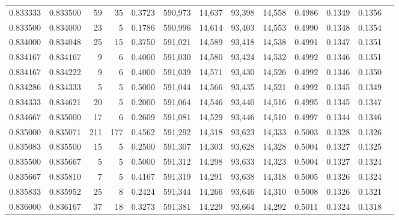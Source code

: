\begin{tabular}{rrrrrrrrrrrrr}
0.833333 & 0.833500 &    59 &  35 &                                     0.3723 & 590,973 &  14,637 &  93,398 &  14,558 & 0.4986 & 0.1349 & 0.1356 \\
0.833500 & 0.834000 &    23 &   5 &                                     0.1786 & 590,996 &  14,614 &  93,403 &  14,553 & 0.4990 & 0.1348 & 0.1354 \\
0.834000 & 0.834048 &    25 &  15 &                                     0.3750 & 591,021 &  14,589 &  93,418 &  14,538 & 0.4991 & 0.1347 & 0.1351 \\
0.834167 & 0.834167 &     9 &   6 &                                     0.4000 & 591,030 &  14,580 &  93,424 &  14,532 & 0.4992 & 0.1346 & 0.1351 \\
0.834167 & 0.834222 &     9 &   6 &                                     0.4000 & 591,039 &  14,571 &  93,430 &  14,526 & 0.4992 & 0.1346 & 0.1350 \\
0.834286 & 0.834333 &     5 &   5 &                                     0.5000 & 591,044 &  14,566 &  93,435 &  14,521 & 0.4992 & 0.1345 & 0.1349 \\
0.834333 & 0.834621 &    20 &   5 &                                     0.2000 & 591,064 &  14,546 &  93,440 &  14,516 & 0.4995 & 0.1345 & 0.1347 \\
0.834667 & 0.835000 &    17 &   6 &                                     0.2609 & 591,081 &  14,529 &  93,446 &  14,510 & 0.4997 & 0.1344 & 0.1346 \\
0.835000 & 0.835071 &   211 & 177 &                                     0.4562 & 591,292 &  14,318 &  93,623 &  14,333 & 0.5003 & 0.1328 & 0.1326 \\
0.835083 & 0.835500 &    15 &   5 &                                     0.2500 & 591,307 &  14,303 &  93,628 &  14,328 & 0.5004 & 0.1327 & 0.1325 \\
0.835500 & 0.835667 &     5 &   5 &                                     0.5000 & 591,312 &  14,298 &  93,633 &  14,323 & 0.5004 & 0.1327 & 0.1324 \\
0.835667 & 0.835810 &     7 &   5 &                                     0.4167 & 591,319 &  14,291 &  93,638 &  14,318 & 0.5005 & 0.1326 & 0.1324 \\
0.835833 & 0.835952 &    25 &   8 &                                     0.2424 & 591,344 &  14,266 &  93,646 &  14,310 & 0.5008 & 0.1326 & 0.1321 \\
0.836000 & 0.836167 &    37 &  18 &                                     0.3273 & 591,381 &  14,229 &  93,664 &  14,292 & 0.5011 & 0.1324 & 0.1318 \\

\end{tabular}
